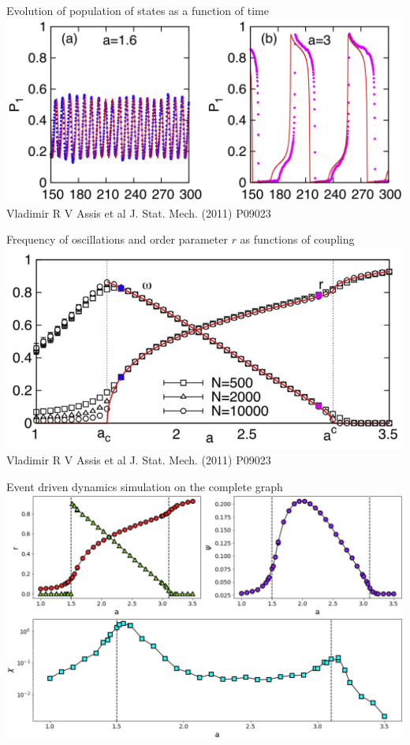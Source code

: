 \documentclass[serif,mathserif]{beamer}
\begin{document}
\begin{frame}
    \centering
    Evolution of population of states as a function of time\\
    \vspace{0.8cm}
    \includegraphics[height=0.6\textheight]{pop-evolution.eps}\\
    Vladimir R V Assis et al J. Stat. Mech. (2011) P09023
\end{frame}

\begin{frame}
    \centering
    Frequency of oscillations and order parameter $r$ as functions of coupling\\
    \vspace{0.8cm}
    \includegraphics[height=0.6\textheight]{rvsa.eps}\\
    Vladimir R V Assis et al J. Stat. Mech. (2011) P09023
\end{frame}

\begin{frame}
    \centering
    Event driven dynamics simulation on the complete graph\\
    \vspace{0.8cm}
    \includegraphics[width=\textwidth]{complete_graph.eps}
\end{frame}
\end{document}
